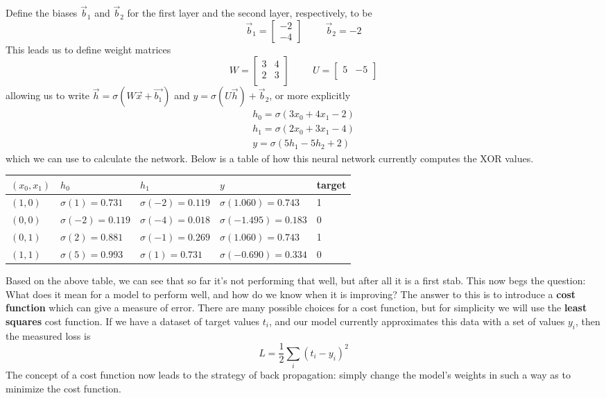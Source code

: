 \documentclass[12pt,letterpaper]{book}
\theoremstyle{definition}
\begin{document}
  Define the biases $\vec{b}_1$ and $\vec{b}_2$ for the first layer and the second layer, respectively, 
  to be 
  \[
    \vec{b}_1 = \begin{bmatrix}
      -2 \\ -4
    \end{bmatrix} 
    \hspace{1cm}
    \vec{b}_2 = -2 
  \]
  This leads us to define weight matrices 
  \[
    W = 
    \begin{bmatrix}
      3 & 4 \\
      2 & 3 \\
    \end{bmatrix}
    \hspace{1cm}
    U = \begin{bmatrix}
      5 & -5 \\
    \end{bmatrix}
  \]
  allowing us to write $\vec{h} = \sigma(W\vec{x} + \vec{b_1})$ and $y = \sigma(U\vec{h}) + \vec{b}_2$, or more explicitly
  \begin{align}
    h_0 = \sigma(3x_0 + 4x_1 -2)\\
    h_1 = \sigma(2x_0 + 3x_1 -4)\\
    y = \sigma(5h_1 - 5h_2 + 2)
  \end{align}
  which we can use to calculate the network.
  Below is a table of how this neural network currently computes the XOR values.
  \begin{center}
    \begin{tabular}{ |p{1.5cm}||p{3cm}|p{3cm}|p{3.5cm}|p{1.5cm}| }
      \hline
      $(x_0, x_1)$ & $h_0$ & $h_1$ & $y$ & target\\
      \hline
      $(1, 0)$ & $\sigma(1) = 0.731$ & $\sigma(-2) = 0.119$ & $\sigma(1.060) = 0.743$ & 1 \\
      \hline
      $(0, 0)$ & $\sigma(-2) = 0.119$ & $\sigma(-4) = 0.018$ & $\sigma(-1.495) = 0.183$  & 0\\
      \hline
      $(0, 1)$ & $\sigma(2) = 0.881$ & $\sigma(-1) = 0.269$ & $\sigma(1.060) = 0.743$ & 1 \\
      \hline
      $(1, 1)$ & $\sigma(5) = 0.993$ & $\sigma(1) = 0.731$ & $\sigma(-0.690) = 0.334$ & 0\\
      \hline
     \end{tabular}
     
  \end{center}
  Based on the above table, we can see that so far it's not performing that well, but after 
  all it is a first stab. This now begs the question: What does it 
  mean for a model to perform well, and how do we know when it is improving? The answer
  to this is to introduce a \textbf{cost function} which can give a measure of error. There are 
  many possible choices for a cost function, but for simplicity we will use the \textbf{least squares}
  cost function. If we have a dataset of target values $t_i$, and our model currently 
  approximates this data with a set of values $y_i$, then the measured loss is 
  \[
      L = \frac{1}{2}\sum_{i}(t_i - y_i)^2
  \]  
  The concept of a cost function now leads to the strategy of back propagation: simply change the 
  model's weights in such a way as to minimize the cost function.
\end{document}
